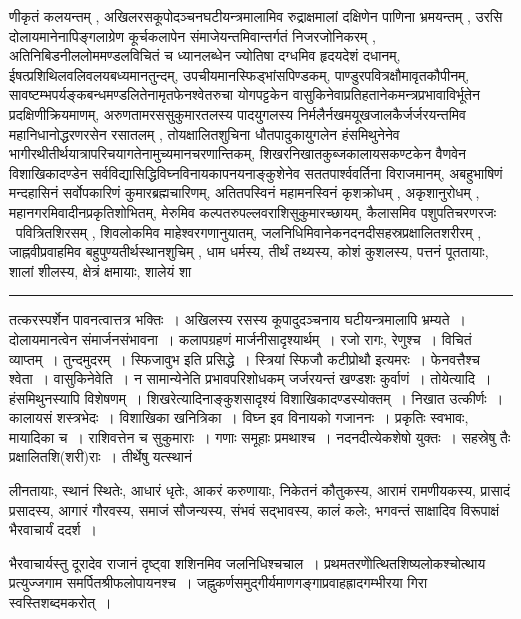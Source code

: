 \documentclass[11pt, openany]{book}
\begin{document}
\noindent
णीकृतं कलयन्तम् , अखिलरसकूपोदञ्चनघटीयन्त्रमालामिव रुद्राक्षमालां दक्षिणेन पाणिना भ्रमयन्तम् , उरसि दोलायमानेनापिङ्गलाग्रेण कूर्चकलापेन संमाजेयन्तमिवान्तर्गतं निजरजोनिकरम् , अतिनिबिडनीललोममण्डलविचितं च ध्यानलब्धेन ज्योतिषा दग्धमिव हृदयदेशं दधानम्, ईषत्प्रशिथिलवलिवलयबध्यमानतुन्दम्, उपचीयमानस्फिड्भांसपिण्डकम्, पाण्डुरपवित्रक्षौमावृतकौपीनम्, सावष्टम्भपर्यङ्कबन्धमण्डलितेनामृतफेनश्वेतरुचा योगपट्टकेन वासुकिनेवाप्रतिहतानेकमन्त्रप्रभावाविर्भूतेन प्रदक्षिणीक्रियमाणम्, अरुणतामरससुकुमारतलस्य पादयुगलस्य निर्मलैर्नखमयूखजालकैर्जर्जरयन्तमिव महानिधानोद्धरणरसेन रसातलम् , तोयक्षालितशुचिना धौतपादुकायुगलेन हंसमिथुनेनेव भागीरथीतीर्थयात्रापरिचयागतेनामुच्यमानचरणान्तिकम्, शिखरनिखातकुब्जकालायसकण्टकेन वैणवेन विशाखिकादण्डेन सर्वविद्यासिद्धिविघ्नविनायकापनयनाङ्कुशेनेव सततपार्श्ववर्तिना विराजमानम्, अबहुभाषिणं मन्दहासिनं सर्वोपकारिणं कुमारब्रह्मचारिणम्, अतितपस्विनं महामनस्विनं कृशक्रोधम् , अकृशानुरोधम् , महानगरमिवादीनप्रकृतिशोभितम्, मेरुमिव कल्पतरुपल्लवराशिसुकुमारच्छायम्, कैलासमिव पशुपतिचरणरजः \textendash\ पवित्रितशिरसम् , शिवलोकमिव माहेश्वरगणानुयातम्, जलनिधिमिवानेकनदनदीसहस्रप्रक्षालितशरीरम् , जाह्नवीप्रवाहमिव बहुपुण्यतीर्थस्थानशुचिम् , धाम धर्मस्य, तीर्थं तथ्यस्य, कोशं कुशलस्य, पत्तनं पूततायाः, शालां शीलस्य, क्षेत्रं क्षमायाः, शालेयं शा\textendash

\vspace{2mm}
\hrule

\noindent
{\s तत्करस्पर्शेन पावनत्वात्तत्र भक्तिः~। अखिलस्य रसस्य कूपादुदञ्चनाय घटीयन्त्रमालापि भ्रम्यते~। दोलायमानत्वेन संमार्जनसंभावना~। कलापग्रहणं मार्जनीसादृश्यार्थम्~। रजो रागः, रेणुश्च~। विचितं व्याप्तम्~। तुन्दमुदरम्~। स्फिजावुभ इति प्रसिद्धे~। {\qt स्त्रियां स्फिजौ कटीप्रोथौ} इत्यमरः~। फेनवत्तैश्च श्वेता~। {\qtt वासुकिनेवेति}~। न सामान्येनेति प्रभावपरिशोधकम् जर्जरयन्तं खण्डशः कुर्वाणं~। {\qtt तोयेत्यादि}~। हंसमिथुनस्यापि विशेषणम्~। शिखरेत्यादिनाङ्कुशसादृश्यं विशाखिकादण्डस्योक्तम्~। निखात उत्कीर्णः~। कालायसं शस्त्रभेदः~। विशाखिका खनित्रिका~। विघ्न इव विनायको गजाननः~। प्रकृतिः स्वभावः, मायादिका च~। राशिवत्तेन च सुकुमाराः~। गणाः समूहाः प्रमथाश्च~। नदनदीत्येकशेषो युक्तः~। सहस्रेषु तैः प्रक्षालितशि(शरी)राः~। तीर्थेषु यत्स्थानं}

\newpage

\noindent
लीनतायाः, स्थानं स्थितेः, आधारं धृतेः, आकरं करुणायाः, निकेतनं कौतुकस्य, आरामं रामणीयकस्य, प्रासादं प्रसादस्य, आगारं गौरवस्य, समाजं सौजन्यस्य, संभवं सद्भावस्य, कालं कलेः, भगवन्तं साक्षादिव विरूपाक्षं भैरवाचार्यं ददर्श~।

भैरवाचार्यस्तु दूरादेव राजानं दृष्ट्वा शशिनमिव जलनिधिश्चचाल~। प्रथमतरणोेत्थितशिष्यलोकश्चोत्थाय प्रत्युज्जगाम समर्पितश्रीफलोपायनश्च~। जह्नुकर्णसमुद्गीर्यमाणगङ्गाप्रवाहह्रादगम्भीरया गिरा स्वस्तिशब्दमकरोत्~।
\end{document}
